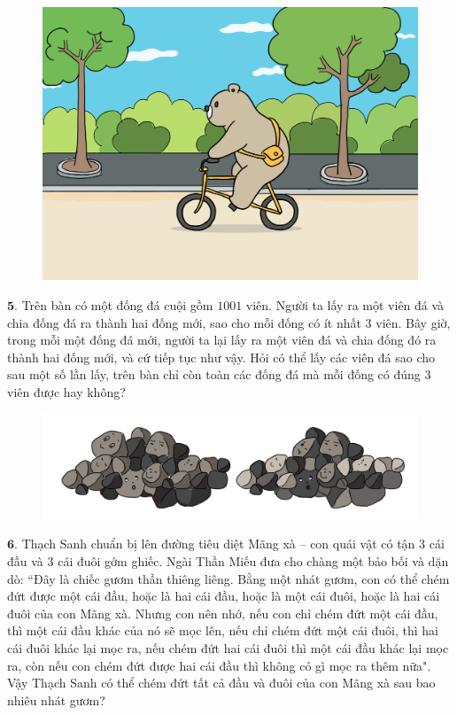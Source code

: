\begin{multicols}{2}
\begin{figure}[H]
		\captionsetup{labelformat= empty, justification=centering}
		\includegraphics[width=1\linewidth]{bai4}
		\vspace*{-5pt}
	\end{figure}
	$\pmb{5.}$ Trên bàn có một đống đá cuội gồm $1001$ viên. Người ta lấy ra một viên đá và chia đống đá ra  thành hai đống mới, sao cho mỗi đống có ít nhất $3$ viên. Bây giờ, trong mỗi một đống đá mới, người ta lại lấy ra một viên đá và chia đống đó ra thành hai đống mới, và cứ tiếp tục như vậy. Hỏi có thể lấy các viên đá sao cho sau một số lần lấy, trên bàn chỉ còn toàn các đống đá mà mỗi đống có đúng $3$ viên được hay không?
	\begin{figure}[H]
		\centering
		\vspace*{-5pt}
		\captionsetup{labelformat= empty, justification=centering}
		\includegraphics[width=1\linewidth]{bai5}
		\vspace*{-15pt}
	\end{figure}
	$\pmb{6.}$ Thạch Sanh chuẩn bị lên đường tiêu diệt Mãng xà -- con quái vật có tận $3$ cái đầu và $3$ cái đuôi gớm ghiếc. Ngài Thần Miếu đưa cho chàng một bảo bối và dặn dò: ``Đây là chiếc gươm thần thiêng liêng. Bằng một nhát gươm, con có thể chém đứt được một cái đầu, hoặc là hai cái đầu, hoặc là một cái đuôi, hoặc là hai cái đuôi của con Mãng xà. Nhưng con nên nhớ, nếu con chỉ chém đứt một cái đầu, thì một cái đầu khác của nó sẽ mọc lên, nếu chỉ chém đứt một cái đuôi, thì hai cái đuôi khác lại mọc ra, nếu chém đứt hai cái đuôi thì một cái đầu khác lại mọc ra, còn nếu con chém đứt được hai cái đầu thì không có gì mọc ra thêm nữa". Vậy Thạch Sanh có thể chém đứt tất cả đầu và đuôi của con Mãng xà sau bao nhiêu nhát gươm?

\end{multicols}
